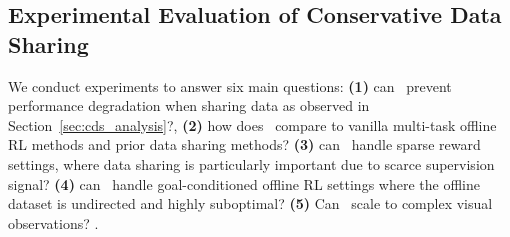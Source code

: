 \newcommand{\CC}{\cellcolor{Gray}}

\subsection{Experimental Evaluation of Conservative Data Sharing}
\label{sec:cds_exp}

We conduct experiments to answer six main questions: \textbf{(1)} can \cdsmethodname\ prevent performance degradation when sharing data as observed in Section~\ref{sec:cds_analysis}?, \textbf{(2)} how does \cdsmethodname\ compare to vanilla multi-task offline RL methods and prior data sharing methods?
\textbf{(3)} can \cdsmethodname\ handle sparse reward settings, where data sharing is particularly important due to scarce supervision signal? \textbf{(4)} can \cdsmethodname\ handle goal-conditioned offline RL settings where the offline dataset is undirected and highly suboptimal? \textbf{(5)} Can \cdsmethodname\ scale to complex visual observations? .

